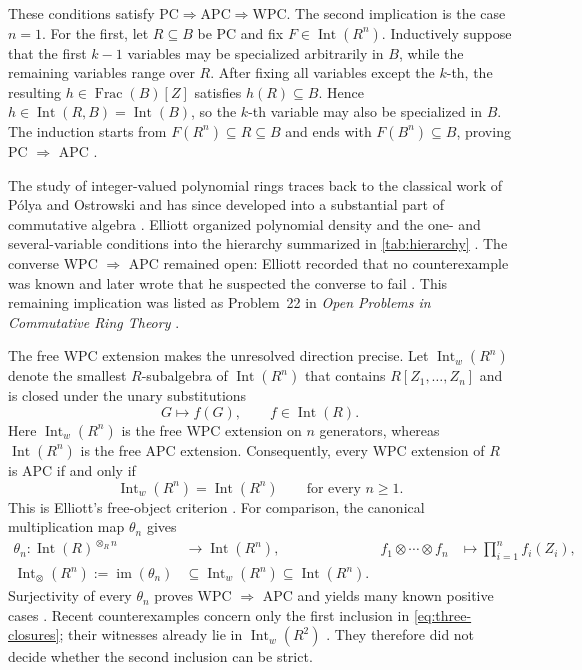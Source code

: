 \documentclass[11pt,reqno]{amsart}
\numberwithin{equation}{section}
\theoremstyle{plain}
\theoremstyle{definition}
\theoremstyle{remark}
\newcommand{\Int}{\operatorname{Int}}
\newcommand{\Frac}{\operatorname{Frac}}
\begin{document}
These conditions satisfy
\(\mathrm{PC}\Longrightarrow\mathrm{APC}\Longrightarrow\mathrm{WPC}\).
The second implication is the case \(n=1\).  For the first, let
\(R\subseteq B\) be PC and fix \(F\in\Int(R^n)\).  Inductively suppose
that the first \(k-1\) variables may be specialized arbitrarily in
\(B\), while the remaining variables range over \(R\).  After fixing
all variables except the \(k\)-th, the resulting
\(h\in\Frac(B)[Z]\) satisfies \(h(R)\subseteq B\).  Hence
\(h\in\Int(R,B)=\Int(B)\), so the \(k\)-th variable may also be
specialized in \(B\).  The induction starts from
\(F(R^n)\subseteq R\subseteq B\) and ends with
\(F(B^n)\subseteq B\), proving PC \(\Rightarrow\) APC
\cite[Section~7]{Elliott2007}.

The study of integer-valued polynomial rings traces back to the
classical work of Pólya and Ostrowski and has since developed into a
substantial part of commutative algebra \cite{CahenChabert1997}.
Elliott organized polynomial density and the one- and several-variable
conditions into the hierarchy summarized in \cref{tab:hierarchy}
\cite{Elliott2007}.  The converse WPC \(\Rightarrow\) APC remained
open: Elliott recorded that
no counterexample was known and later wrote that he suspected the
converse to fail \cite[p.~232]{Elliott2009}
\cite[Section~6]{Elliott2013}.  This remaining implication was listed
as Problem~22 in \emph{Open Problems in Commutative Ring Theory}
\cite{CahenFontanaFrischGlaz2014}.

The free WPC extension makes the unresolved direction precise.  Let
\(\Int_w(R^n)\) denote the smallest \(R\)-subalgebra of
\(\Int(R^n)\) that contains \(R[Z_1,\ldots,Z_n]\) and is closed under
the unary substitutions
\[
 G\longmapsto f(G),\qquad f\in\Int(R).
\]
Here \(\Int_w(R^n)\) is the free WPC extension on \(n\) generators,
whereas \(\Int(R^n)\) is the free APC extension.  Consequently, every
WPC extension of \(R\) is APC if and only if
\[
 \Int_w(R^n)=\Int(R^n)
 \qquad\text{for every }n\geq1.
\]
This is Elliott's free-object criterion
\cite[p.~232, Proposition~5.2]{Elliott2009}.  For comparison, the
canonical multiplication map \(\theta_n\) gives
\begin{equation}
 \begin{aligned}
 \theta_n:\Int(R)^{\otimes_R n}&\longrightarrow\Int(R^n),&
 f_1\otimes\cdots\otimes f_n&\longmapsto\prod_{i=1}^n f_i(Z_i),\\
 \Int_{\otimes}(R^n):=\operatorname{im}(\theta_n)
 &\subseteq\Int_w(R^n)\subseteq\Int(R^n).&&
 \end{aligned}
 \label{eq:three-closures}
\end{equation}
Surjectivity of every \(\theta_n\) proves WPC \(\Rightarrow\) APC and
yields many known positive cases \cite{Elliott2007,Elliott2009}.
Recent counterexamples concern only the first inclusion in
\eqref{eq:three-closures}; their witnesses already lie in
\(\Int_w(R^2)\) \cite{PengTaoWangYu2026,JiangEtAl2026}.  They therefore
did not decide whether the second inclusion can be strict.
\end{document}
